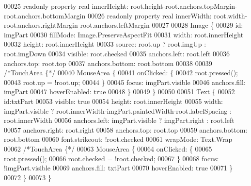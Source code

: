 \begin{DoxyCode}
00025     readonly \textcolor{keyword}{property} real innerHeight: root.height-root.anchors.topMargin-root.anchors.bottomMargin
00026     readonly \textcolor{keyword}{property} real innerWidth: root.width-root.anchors.rightMargin-root.anchors.leftMargin
00027 
00028     Image \{
00029         \textcolor{keywordtype}{id}: imgPart
00030         fillMode: Image.PreserveAspectFit
00031         width: root.innerHeight
00032         height: root.innerHeight
00033         source: root.up ? root.imgUp : root.imgDown
00034         visible: root.checked
00035         anchors.left: root.left
00036         anchors.top: root.top
00037         anchors.bottom: root.bottom
00038 
00039         \textcolor{comment}{/*TouchArea \{*/}
00040         MouseArea \{
00041             onClicked: \{
00042                 root.pressed();
00043                 root.up = !root.up;
00044             \}
00045             focus: imgPart.visible
00046             anchors.fill: imgPart
00047             hoverEnabled: \textcolor{keyword}{true}
00048         \}
00049     \}
00050 
00051     Text \{
00052         \textcolor{keywordtype}{id}:txtPart
00053         visible: \textcolor{keyword}{true}
00054         height: root.innerHeight
00055         width: imgPart.visible ? root.innerWidth-imgPart.paintedWidth-root.labelSpacing : root.innerWidth
00056         anchors.left: imgPart.visible ? imgPart.right : root.left
00057         anchors.right: root.right
00058         anchors.top: root.top
00059         anchors.bottom: root.bottom
00060         font.strikeout: !root.checked
00061         wrapMode: Text.Wrap
00062         \textcolor{comment}{/*TouchArea \{*/}
00063         MouseArea \{
00064             onClicked: \{
00065                 root.pressed();
00066                 root.checked = !root.checked;
00067             \}
00068             focus: !imgPart.visible
00069             anchors.fill: txtPart
00070             hoverEnabled: \textcolor{keyword}{true}
00071         \}
00072     \}
00073 \}
\end{DoxyCode}
